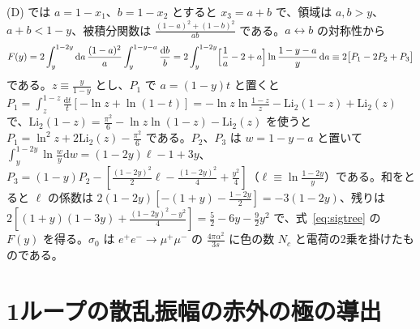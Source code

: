\documentclass[a4paper,10pt]{ltjsarticle}
\newcommand{\dd}{\mathrm{d}}
\begin{document}
(D) では $a=1-x_1$、$b=1-x_2$ とすると $x_3=a+b$ で、領域は $a,b>y$、$a+b<1-y$、被積分関数は $\frac{(1-a)^2+(1-b)^2}{ab}$ である。$a\leftrightarrow b$ の対称性から
\begin{equation*}
F(y)=2\int_y^{1-2y}\dd a\,\frac{(1-a)^2}{a}\int_y^{1-y-a}\frac{\dd b}{b}=2\int_y^{1-2y}\Bigl[\frac1a-2+a\Bigr]\ln\frac{1-y-a}{y}\,\dd a\equiv2\bigl[P_1-2P_2+P_3\bigr]
\end{equation*}
である。$z\equiv\frac{y}{1-y}$ とし、$P_1$ で $a=(1-y)t$ と置くと $P_1=\int_z^{1-z}\frac{\dd t}t[-\ln z+\ln(1-t)]=-\ln z\ln\frac{1-z}{z}-\mathrm{Li}_2(1-z)+\mathrm{Li}_2(z)$ で、$\mathrm{Li}_2(1-z)=\frac{\pi^2}6-\ln z\ln(1-z)-\mathrm{Li}_2(z)$ を使うと $P_1=\ln^2z+2\mathrm{Li}_2(z)-\frac{\pi^2}6$ である。$P_2$、$P_3$ は $w=1-y-a$ と置いて $\int_y^{1-2y}\ln\frac wy\dd w=(1-2y)\ell-1+3y$、$P_3=(1-y)P_2-[\frac{(1-2y)^2}2\ell-\frac{(1-2y)^2}4+\frac{y^2}4]$（$\ell\equiv\ln\frac{1-2y}{y}$）である。和をとると $\ell$ の係数は $2(1-2y)[-(1+y)-\frac{1-2y}2]=-3(1-2y)$、残りは $2[(1+y)(1-3y)+\frac{(1-2y)^2-y^2}4]=\frac52-6y-\frac92y^2$ で、式~\eqref{eq:sigtree} の $F(y)$ を得る。$\sigma_0$ は $e^+e^-\to\mu^+\mu^-$ の $\frac{4\pi\alpha^2}{3s}$ に色の数 $N_c$ と電荷の2乗を掛けたものである。

\section{1ループの散乱振幅の赤外の極の導出}\label{app:ir}
\end{document}
